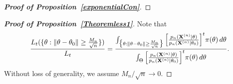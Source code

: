 \documentclass[3p]{elsarticle}
\theoremstyle{plain}
\theoremstyle{definition}
\theoremstyle{remark}
\begin{document}
\begin{appendices}
\begin{proof}[\textbf{Proof of Proposition~\ref{exponentialCon}}]
\end{proof}

\begin{proof}[\textbf{Proof of Proposition~\ref{Theoremless1}}]
    Note that
       \begin{equation}\label{eq:numden}
       \frac{L_{t} (\{\theta: \|\theta-\theta_0\|\geq \frac{M_n}{\sqrt{n}}\})}
           {L_{t}}
=
    \frac{
        \int_{\big\{\theta: \|\theta-\theta_0\|\geq \frac{M_n}{\sqrt{n}}\big\}} \Big[ \frac{p_n(\mathbf{X}^{(n)}|\theta)}{p_n(\mathbf{X}^{(n)}|\theta_0)} \Big]^{t} \pi(\theta) \, d \theta
    }{
        \int_{\Theta} \Big[ \frac{p_n(\mathbf{X}^{(n)}|\theta)}{p_n(\mathbf{X}^{(n)}|\theta_0)} \Big]^{t} \pi(\theta) \, d \theta
    }.
       \end{equation}
    Without loss of generality, we assume ${M_n}/{\sqrt{n}}\to 0$.


\end{proof}
\end{appendices}
\end{document}
